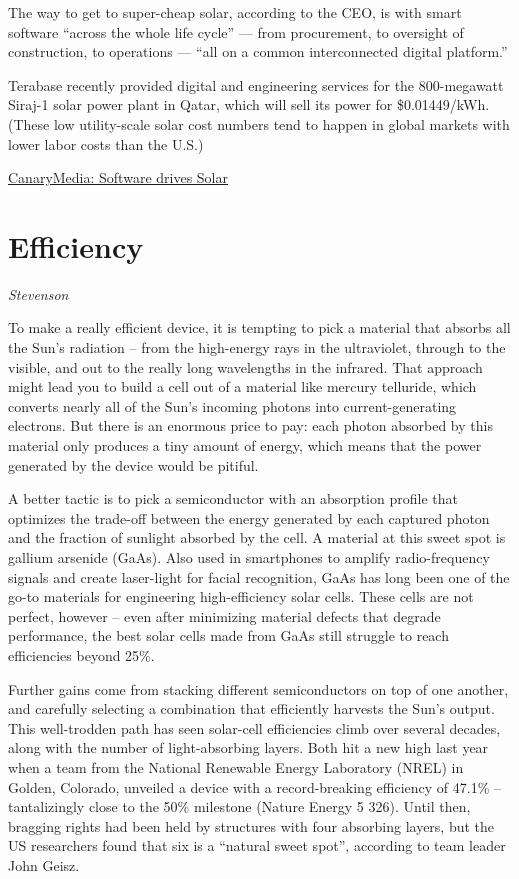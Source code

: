 \documentclass[
]{book}
\begin{document}
The way to get to super-cheap solar, according to the CEO, is with smart software ``across the whole life cycle'' --- from procurement, to oversight of construction, to operations --- ``all on a common interconnected digital platform.''

Terabase recently provided digital and engineering services for the 800-megawatt Siraj-1 solar power plant in Qatar, which will sell its power for \$0.01449/kWh. (These low utility-scale solar cost numbers tend to happen in global markets with lower labor costs than the U.S.)

\href{https://www.canarymedia.com/articles/software-will-eat-solar-driving-utility-scale-solar-prices-below-1-cent-per-kilowatt-hour-by-2025/}{CanaryMedia: Software drives Solar}

\hypertarget{efficiency}{%
\section{Efficiency}\label{efficiency}}

\emph{Stevenson}

To make a really efficient device, it is tempting to pick a material that absorbs all the Sun's radiation -- from the high-energy rays in the ultraviolet, through to the visible, and out to the really long wavelengths in the infrared. That approach might lead you to build a cell out of a material like mercury telluride, which converts nearly all of the Sun's incoming photons into current-generating electrons. But there is an enormous price to pay: each photon absorbed by this material only produces a tiny amount of energy, which means that the power generated by the device would be pitiful.

A better tactic is to pick a semiconductor with an absorption profile that optimizes the trade-off between the energy generated by each captured photon and the fraction of sunlight absorbed by the cell. A material at this sweet spot is gallium arsenide (GaAs). Also used in smartphones to amplify radio-frequency signals and create laser-light for facial recognition, GaAs has long been one of the go-to materials for engineering high-efficiency solar cells. These cells are not perfect, however -- even after minimizing material defects that degrade performance, the best solar cells made from GaAs still struggle to reach efficiencies beyond 25\%.

Further gains come from stacking different semiconductors on top of one another, and carefully selecting a combination that efficiently harvests the Sun's output. This well-trodden path has seen solar-cell efficiencies climb over several decades, along with the number of light-absorbing layers. Both hit a new high last year when a team from the National Renewable Energy Laboratory (NREL) in Golden, Colorado, unveiled a device with a record-breaking efficiency of 47.1\% -- tantalizingly close to the 50\% milestone (Nature Energy 5 326). Until then, bragging rights had been held by structures with four absorbing layers, but the US researchers found that six is a ``natural sweet spot'', according to team leader John Geisz.
\end{document}
